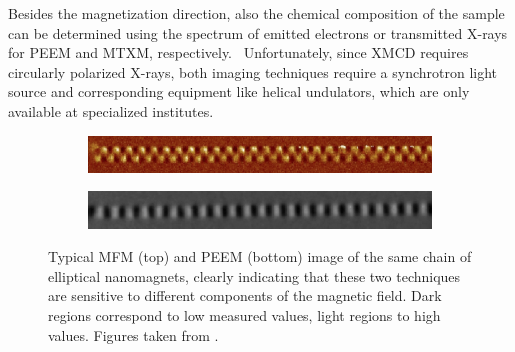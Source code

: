 \documentclass[11pt,a4paper,english]{article}
\begin{document}
Besides the magnetization direction, also the chemical composition of the sample can be determined using the spectrum of emitted electrons or transmitted X-rays for PEEM and MTXM, respectively.~\cite{PEEM,Imaging_MTXM} Unfortunately, since XMCD requires circularly polarized X-rays, both imaging techniques require a synchrotron light source and corresponding equipment like helical undulators, which are only available at specialized institutes.

\begin{figure}
     \centering
     \begin{subfigure}[b]{0.8\textwidth}
         \centering
         \includegraphics[width=\textwidth]{Figures/Introduction/NML_Carlton - Figure 1.15 cropped.png}
     \end{subfigure}
     \begin{subfigure}[b]{0.8\textwidth}
         \centering
         \includegraphics[width=\textwidth]{Figures/Introduction/NML_Carlton - Figure 1.17 cropped.png}
     \end{subfigure}
     \caption{Typical MFM (top) and PEEM (bottom) image of the same chain of elliptical nanomagnets, clearly indicating that these two techniques are sensitive to different components of the magnetic field. Dark regions correspond to low measured values, light regions to high values. Figures taken from \cite{NML_Carlton}.}
     \label{fig:Intro_Imaging}
\end{figure} %
\end{document}
